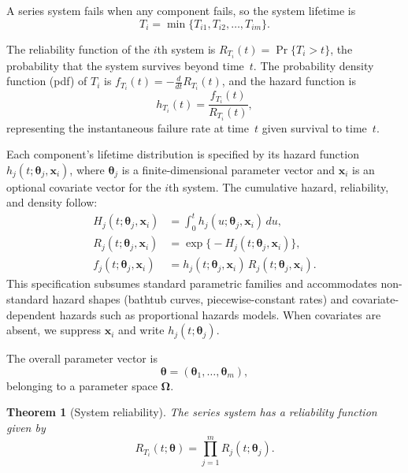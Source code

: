 \documentclass[11pt]{article}
\theoremstyle{definition}
\theoremstyle{plain}
\newtheorem{theorem}{Theorem}
\renewcommand{\v}[1]{\boldsymbol{#1}}
\newcommand{\btheta}{\v{\theta}}
\newcommand{\bomega}{\v{\Omega}}
\begin{document}
A series system fails when any component fails, so the system lifetime is
\begin{equation}
\label{eq:series-def}
    T_i = \min\bigl\{T_{i1}, T_{i2}, \ldots, T_{im}\bigr\}.
\end{equation}

The reliability function of the $i$th system is
$R_{T_i}(t) = \Pr\{T_i > t\}$,
the probability that the system survives beyond time~$t$.
The probability density function (pdf) of $T_i$ is
$f_{T_i}(t) = -\frac{d}{dt} R_{T_i}(t)$,
and the hazard function is
\begin{equation}
\label{eq:hazard-def}
    h_{T_i}(t) = \frac{f_{T_i}(t)}{R_{T_i}(t)},
\end{equation}
representing the instantaneous failure rate at time~$t$ given survival to
time~$t$.

Each component's lifetime distribution is specified by its hazard
function $h_j(t; \v{\theta}_j, \v{x}_i)$, where $\v{\theta}_j$ is a
finite-dimensional parameter vector and $\v{x}_i$ is an optional
covariate vector for the $i$th system.
The cumulative hazard, reliability, and density follow:
\begin{align}
\label{eq:cumhaz-def}
    H_j(t; \v{\theta}_j, \v{x}_i)
    &= \int_0^t h_j(u; \v{\theta}_j, \v{x}_i) \, du, \\
\label{eq:rel-from-haz}
    R_j(t; \v{\theta}_j, \v{x}_i)
    &= \exp\bigl\{-H_j(t; \v{\theta}_j, \v{x}_i)\bigr\}, \\
\label{eq:pdf-from-haz}
    f_j(t; \v{\theta}_j, \v{x}_i)
    &= h_j(t; \v{\theta}_j, \v{x}_i) \, R_j(t; \v{\theta}_j, \v{x}_i).
\end{align}
This specification subsumes standard parametric families and
accommodates non-standard hazard shapes (bathtub curves,
piecewise-constant rates) and covariate-dependent hazards such as
proportional hazards models.
When covariates are absent, we suppress $\v{x}_i$ and write
$h_j(t; \v{\theta}_j)$.

The overall parameter vector is
\begin{equation}
    \btheta = (\v{\theta}_1, \ldots, \v{\theta}_m),
\end{equation}
belonging to a parameter space $\bomega$.

\begin{theorem}[System reliability]
\label{thm:sys-reliability}
The series system has a reliability function given by
\begin{equation}
\label{eq:sys-reliability}
    R_{T_i}(t; \btheta) = \prod_{j=1}^m R_j(t; \v{\theta}_j).
\end{equation}
\end{theorem}
\end{document}
